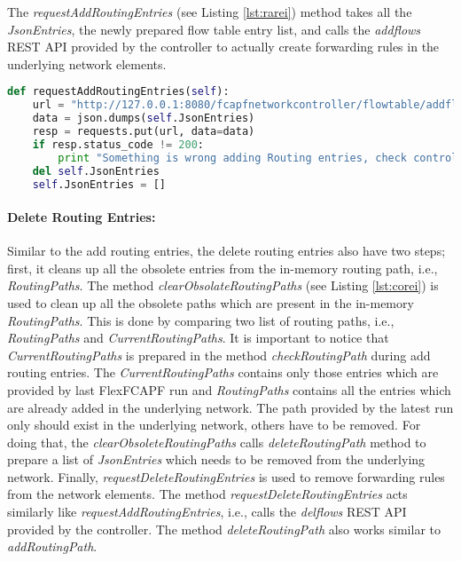 The \textit{requestAddRoutingEntries} (see Listing \ref{lst:rarei}) method takes all the \textit{JsonEntries}, the newly prepared flow table entry list, and calls the \textit{addflows} REST API provided by the controller to actually create forwarding rules in the underlying network elements.
\begin{lstlisting}[caption={Request add routing entries implementation},label={lst:rarei},language=Python,tabsize=2,basicstyle=\footnotesize,breaklines=true, showspaces=false,showstringspaces=false,showtabs=false,frame=single]
def requestAddRoutingEntries(self):
	url = "http://127.0.0.1:8080/fcapfnetworkcontroller/flowtable/addflows"
	data = json.dumps(self.JsonEntries)
	resp = requests.put(url, data=data)
	if resp.status_code != 200:
		print "Something is wrong adding Routing entries, check controller log!!"
	del self.JsonEntries
	self.JsonEntries = []
\end{lstlisting}

\paragraph{Delete Routing Entries:}
Similar to the add routing entries, the delete routing entries also have two steps; first, it cleans up all the obsolete entries from the in-memory routing path, i.e., \textit{RoutingPaths}. The method \textit{clearObsolateRoutingPaths} (see Listing \ref{lst:corei}) is used to clean up all the obsolete paths which are present in the in-memory \textit{RoutingPaths}. This is done by comparing two list of routing paths, i.e., \textit{RoutingPaths} and \textit{CurrentRoutingPaths}. It is important to notice that \textit{CurrentRoutingPaths} is prepared in the method \textit{checkRoutingPath} during add routing entries. The \textit{CurrentRoutingPaths} contains only those entries which are provided by last FlexFCAPF run and \textit{RoutingPaths} contains all the entries which are already added in the underlying network. The path provided by the latest run only should exist in the underlying network, others have to be removed. For doing that, the \textit{clearObsoleteRoutingPaths} calls \textit{deleteRoutingPath} method to prepare a list of \textit{JsonEntries} which needs to be removed from the underlying network. Finally, \textit{requestDeleteRoutingEntries} is used to remove forwarding rules from the network elements. The method \textit{requestDeleteRoutingEntries} acts similarly like \textit{requestAddRoutingEntries}, i.e., calls the \textit{delflows} REST API provided by the controller. The method \textit{deleteRoutingPath} also works similar to \textit{addRoutingPath}.

